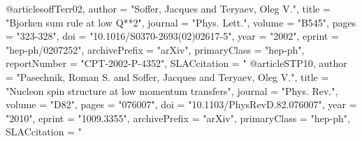 @article{soffTerr02,
      author         = "Soffer, Jacques and Teryaev, Oleg V.",
      title          = "{Bjorken sum rule at low Q**2}",
      journal        = "Phys. Lett.",
      volume         = "B545",
      pages          = "323-328",
      doi            = "10.1016/S0370-2693(02)02617-5",
      year           = "2002",
      eprint         = "hep-ph/0207252",
      archivePrefix  = "arXiv",
      primaryClass   = "hep-ph",
      reportNumber   = "CPT-2002-P-4352",
      SLACcitation   = "%
}
@article{STP10,
      author         = "Pasechnik, Roman S. and Soffer, Jacques and Teryaev, Oleg V.",
      title          = "{Nucleon spin structure at low momentum transfers}",
      journal        = "Phys. Rev.",
      volume         = "D82",
      pages          = "076007",
      doi            = "10.1103/PhysRevD.82.076007",
      year           = "2010",
      eprint         = "1009.3355",
      archivePrefix  = "arXiv",
      primaryClass   = "hep-ph",
      SLACcitation   = "%
}




